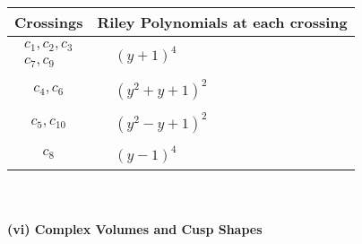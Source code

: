 \documentclass[1p]{elsarticle_modified}
\theoremstyle{definition}
\begin{document}
\begin{tabular}{m{50pt}|m{274pt}}
Crossings & \hspace{64pt}Riley Polynomials at each crossing \\
\hline $$\begin{aligned}c_{1},c_{2},c_{3}\\c_{7},c_{9}\end{aligned}$$&$\begin{aligned}
&(y+1)^4
\end{aligned}$\\
\hline $$\begin{aligned}c_{4},c_{6}\end{aligned}$$&$\begin{aligned}
&(y^2+y+1)^2
\end{aligned}$\\
\hline $$\begin{aligned}c_{5},c_{10}\end{aligned}$$&$\begin{aligned}
&(y^2- y+1)^2
\end{aligned}$\\
\hline $$\begin{aligned}c_{8}\end{aligned}$$&$\begin{aligned}
&(y-1)^4
\end{aligned}$\\
\hline
\end{tabular}\\~\\
\newpage\flushleft \textbf{(vi) Complex Volumes and Cusp Shapes}
\end{document}

